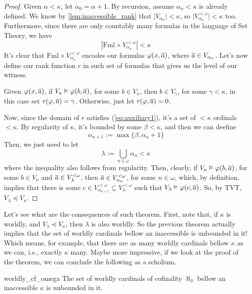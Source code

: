 \begin{proof}
    Given $\alpha<\kappa$, let $\alpha_0=\alpha+1$. By recursion, assume $\alpha_n<\kappa$ is already defined. We know by \cref{lem:inaccessible_rank} that $\lvert V_{\alpha_n}\rvert<\kappa$, so $\lvert V_{\alpha_n}^{<\omega}\rvert<\kappa$ too. Furthermore, since there are only countably many formulas in the language of Set Theory, we have
    \begin{equation}\label{eq:auxiliary1}
        \left\lvert\mathrm{Fml}\times V_{\alpha_n}^{<\omega}\right\rvert<\kappa
    \end{equation}
    It's clear that $\mathrm{Fml}\times V_{\alpha_n}^{<\omega}$ encodes our formulas $\varphi(x,\overline{a})$, where $\overline{a}\in V_{\alpha_n}$. Let's now define our rank function $r$ in such set of formulas that gives us the level of our witness.

    Given $\varphi(x,\overline{a})$, if $V_\kappa\vDash\varphi(b,\overline{a})$, for some $b\in V_\kappa$, then $b\in V_\gamma$, for some $\gamma<\kappa$, in this case set $r(\varphi,\overline{a})=\gamma$. Otherwise, just let $r(\varphi,\overline{a})=0$.

    Now, since the domain of $r$ satisfies (\ref{eq:auxiliary1}), it's a set of $<\kappa$ ordinals $<\kappa$. By regularity of $\kappa$, it's bounded by some $\beta<\kappa$, and then we can deefine
    $$\alpha_{n+1}:=\max\{\beta,\alpha_n+1\}$$
    Then, we just need to let
    $$\lambda:=\bigcup_{n\in\omega}\alpha_n<\kappa$$
    where the inequality also follows from regularity. Then, clearly, if $V_\kappa\vDash\varphi(b,\overline{a})$, for some $b\in V_\kappa$ and $\overline{a}\in V_\lambda^{<\omega}$, then $\overline{a}\in V_{\alpha_n}^{<\omega}$, for some $n\in\omega$, which, by definition, implies that there is some $c\in V_{\alpha_{n+1}}^{<\omega}\subseteq V_\lambda^{<\omega}$ such that $V_\lambda\vDash\varphi(c,\overline{a})$. So, by TVT, $V_\lambda\preceq V_\kappa$.
\end{proof}

Let's see what are the consequences of such theorem. First, note that, if $\kappa$ is worldly, and $V_\lambda\preceq V_\kappa$, then $\lambda$ is also worldly. So the previous theorem actually implies that the set of worldly cardinals bellow an inaccessible is unbounded in it! Which means, for example, that there are as many worldly cardinals bellow $\kappa$ as we can, i.e., exactly $\kappa$ many. Maybe more impressive, if we look at the proof of the theorem, we can conclude the following as a scholium.

\begin{corollary}{}{worldly_cf_omega}
    The set of worldly cardinals of cofinality $\aleph_0$ bellow an inaccessible $\kappa$ is unbounded in it.
\end{corollary}

